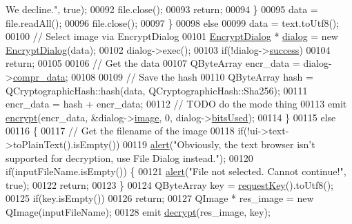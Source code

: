 \begin{DoxyCode}
{       We decline."}, \textcolor{keyword}{true});
00092                 file.close();
00093                 \textcolor{keywordflow}{return};
00094             \}
00095             data = file.readAll();
00096             file.close();
00097         \}
00098         \textcolor{keywordflow}{else}
00099             data = text.toUtf8();
00100         \textcolor{comment}{// Select image via EncryptDialog}
00101         \hyperlink{class_encrypt_dialog}{EncryptDialog} * \hyperlink{class_view_p_c_a31abbb470fe329b44e6ffee202b903ca}{dialog} = \textcolor{keyword}{new} \hyperlink{class_encrypt_dialog}{EncryptDialog}(data);
00102         dialog->exec();
00103         \textcolor{keywordflow}{if}(!dialog->\hyperlink{class_encrypt_dialog_ada4900bcd40894d9c098c65aa4066ac9}{success})
00104             \textcolor{keywordflow}{return};
00105 
00106         \textcolor{comment}{// Get the data}
00107         QByteArray encr\_data = dialog->\hyperlink{class_encrypt_dialog_a3e8998aa39696cbd1242f6420ef18143}{compr\_data};
00108 
00109         \textcolor{comment}{// Save the hash}
00110         QByteArray hash = QCryptographicHash::hash(data, QCryptographicHash::Sha256);
00111         encr\_data = hash + encr\_data;
00112         \textcolor{comment}{// TODO do the mode thing}
00113         emit \hyperlink{class_view_p_c_a27ecfb84029d42029631b776a02ff5d8}{encrypt}(encr\_data, &dialog->\hyperlink{class_encrypt_dialog_a739a0df1d28d06b28a3fd16e2bc16c73}{image}, 0, dialog->\hyperlink{class_encrypt_dialog_abf638fea37fbdbaba215954e2e239860}{bitsUsed});
00114     \}
00115     \textcolor{keywordflow}{else}
00116     \{
00117         \textcolor{comment}{// Get the filename of the image}
00118         \textcolor{keywordflow}{if}(!ui->text->toPlainText().isEmpty())
00119             \hyperlink{class_view_p_c_a7c467169467789561078abc9d4fe57bd}{alert}(\textcolor{stringliteral}{"Obviously, the text browser isn't supported for decryption, use File Dialog
       instead."});
00120         \textcolor{keywordflow}{if}(inputFileName.isEmpty()) \{
00121             \hyperlink{class_view_p_c_a7c467169467789561078abc9d4fe57bd}{alert}(\textcolor{stringliteral}{"File not selected. Cannot continue!"}, \textcolor{keyword}{true});
00122             \textcolor{keywordflow}{return};
00123         \}
00124         QByteArray key = \hyperlink{class_view_p_c_a559c95675ec98b15451f3bca47033d9c}{requestKey}().toUtf8();
00125         \textcolor{keywordflow}{if}(key.isEmpty())
00126             \textcolor{keywordflow}{return};
00127         QImage * res\_image = \textcolor{keyword}{new} QImage(inputFileName);
00128         emit \hyperlink{class_view_p_c_aef365fa37c40972e1c1504de647fee12}{decrypt}(res\_image, key);

\end{DoxyCode}
